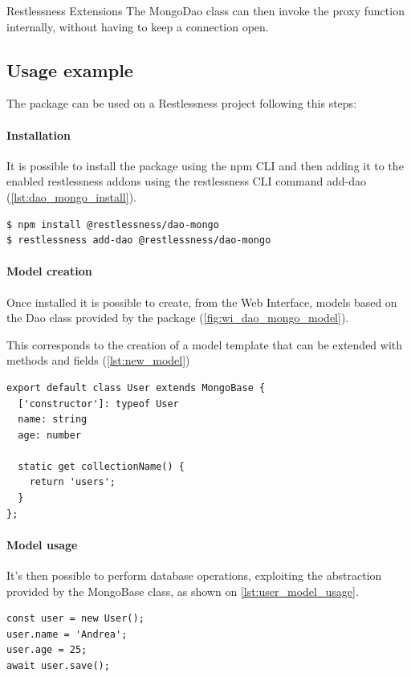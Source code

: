 \begin{chapter}{Restlessness Extensions}
    The MongoDao class can then invoke the proxy function internally, without having
    to keep a connection open.

    \subsection{Usage example}
    The package can be used on a Restlessness project following this steps:

    \paragraph{Installation}
    It is possible to install the package using the npm CLI and then adding it to
    the enabled restlessness addons using the restlessness CLI command add-dao
    (\ref{lst:dao_mongo_install}).
    \begin{lstlisting}[caption=dao-mongo installation, label={lst:dao_mongo_install}]
$ npm install @restlessness/dao-mongo
$ restlessness add-dao @restlessness/dao-mongo
    \end{lstlisting}

    \paragraph{Model creation}
    Once installed it is possible to create, from the Web Interface, models based on
    the Dao class provided by the package (\ref{fig:wi_dao_mongo_model}).

    This corresponds to the creation of a model template that can be extended with
    methods and fields (\ref{lst:new_model})
    \begin{lstlisting}[caption=A new model based on the dao-mongo package, label={lst:new_model}]
export default class User extends MongoBase {
  ['constructor']: typeof User
  name: string
  age: number

  static get collectionName() {
    return 'users';
  }
};
    \end{lstlisting}

    \paragraph{Model usage}
    It's then possible to perform database operations, exploiting the abstraction
    provided by the MongoBase class, as shown on \ref{lst:user_model_usage}.
    \begin{lstlisting}[caption=User model usage, label={lst:user_model_usage}]
const user = new User();
user.name = 'Andrea';
user.age = 25;
await user.save();
    \end{lstlisting}


\end{chapter}
